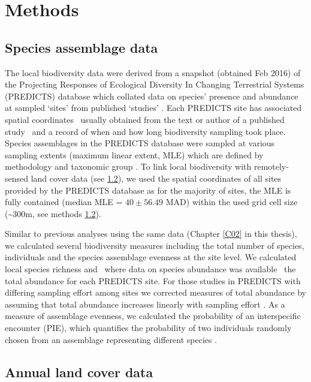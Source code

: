 \section{Methods}
\label{C04_02}
\subsection{Species assemblage data}
\label{C04_0201}

The local biodiversity data were derived from a snapshot (obtained Feb 2016) of the Projecting Responses of Ecological Diversity In Changing Terrestrial Systems (PREDICTS) database which collated data on species’ presence and abundance at sampled ‘sites’ from published ‘studies’ \citep{Hudson2016}. Each PREDICTS site has associated spatial coordinates \textendash\ usually obtained from the text or author of a published study \textendash\ and a record of when and how long biodiversity sampling took place. Species assemblages in the PREDICTS database were sampled at various sampling extents (maximum linear extent, MLE) which are defined by methodology and taxonomic group \citep{Hudson2014}. To link local biodiversity with remotely-sensed land cover data (see \ref{C04_0202}), we used the spatial coordinates of all sites provided by the PREDICTS database as for the majority of sites, the MLE is fully contained (median MLE = $40 \pm 56.49$ MAD) within the used grid cell size (\textasciitilde 300m, see methods \ref{C04_0202}).   

Similar to previous analyses using the same data (\eg Chapter \ref{C02} in this thesis), we calculated several biodiversity measures including the total number of species, individuals and the species assemblage evenness at the site level. We calculated local species richness and \textendash\ where data on species abundance was available \textendash\ the total abundance for each PREDICTS site. For those studies in PREDICTS with differing sampling effort among sites we corrected measures of total abundance by assuming that total abundance increases linearly with sampling effort \citep{Newbold2014b,Newbold2015}. As a measure of assemblage evenness, we calculated the probability of an interspecific encounter (PIE), which quantifies the probability of two individuals randomly chosen from an assemblage representing different species \citep{Hurlbert1971}. 

\subsection{Annual land cover data}
\label{C04_0202}

